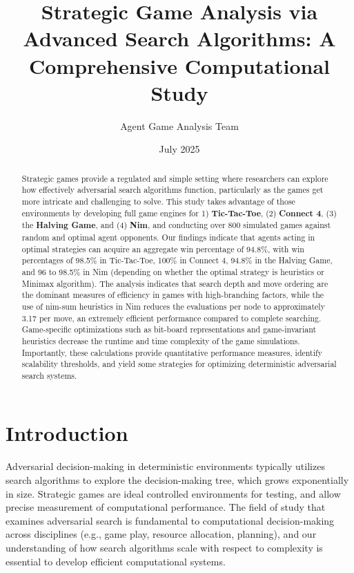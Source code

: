 \documentclass[12pt]{article}
\title{Strategic Game Analysis via Advanced Search Algorithms: A Comprehensive Computational Study}
\author{Agent Game Analysis Team}
\date{July 2025}
\begin{document}
\maketitle

\begin{abstract}
Strategic games provide a regulated and simple setting where researchers can explore how effectively adversarial search algorithms function, particularly as the games get more intricate and challenging to solve. This study takes advantage of those environments by developing full game engines for 1) \textbf{Tic-Tac-Toe}, (2) \textbf{Connect 4}, (3) the \textbf{Halving Game}, and (4) \textbf{Nim}, and conducting over 800 simulated games against random and optimal agent opponents. Our findings indicate that agents acting in optimal strategies can acquire an aggregate win percentage of 94.8\%, with win percentages of 98.5\% in Tic-Tac-Toe, 100\% in Connect 4, 94.8\% in the Halving Game, and 96 to 98.5\% in Nim (depending on whether the optimal strategy is heuristics or Minimax algorithm). The analysis indicates that search depth and move ordering are the dominant measures of efficiency in games with high-branching factors, while the use of nim-sum heuristics in Nim reduces the evaluations per node to approximately 3.17 per move, an extremely efficient performance compared to complete searching. Game-specific optimizations such as bit-board representations and game-invariant heuristics decrease the runtime and time complexity of the game simulations. Importantly, these calculations provide quantitative performance measures, identify scalability thresholds, and yield some strategies for optimizing deterministic adversarial search systems.
\end{abstract}

\section{Introduction}

Adversarial decision-making in deterministic environments typically utilizes search algorithms to explore the decision-making tree, which grows exponentially in size. Strategic games are ideal controlled environments for testing, and allow precise measurement of computational performance. The field of study that examines adversarial search is fundamental to computational decision-making across disciplines (e.g., game play, resource allocation, planning), and our understanding of how search algorithms scale with respect to complexity is essential to develop efficient computational systems.
\end{document}
